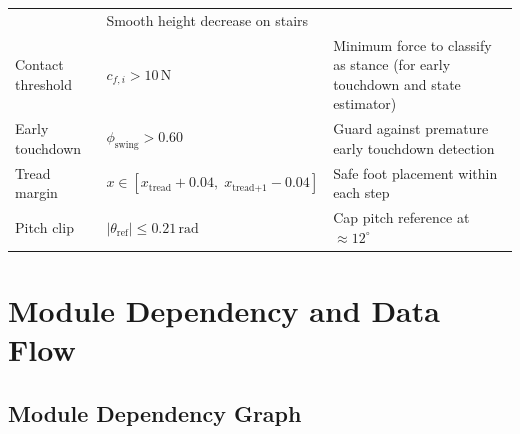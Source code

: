 \documentclass[12pt,a4paper]{report}
\begin{document}
\begin{longtable}{p{4cm}p{4cm}p{6cm}}
                   & Smooth height decrease on stairs \\
Contact threshold  & $c_{f,i} > 10\,\text{N}$
                   & Minimum force to classify as stance (for early touchdown and state estimator) \\
Early touchdown    & $\phi_\text{swing} > 0.60$
                   & Guard against premature early touchdown detection \\
Tread margin       & $x \in [x_\text{tread} + 0.04,\; x_\text{tread+1} - 0.04]$
                   & Safe foot placement within each step \\
Pitch clip         & $|\theta_\text{ref}| \leq 0.21\,\text{rad}$
                   & Cap pitch reference at $\approx 12^\circ$ \\
\end{longtable}

\chapter{Module Dependency and Data Flow}

\section{Module Dependency Graph}
\end{document}
